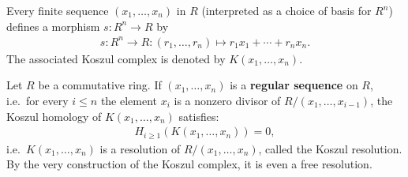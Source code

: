     \begin{example}
        Every finite sequence $(x_1,\ldots,x_n)$ in $R$ (interpreted as a choice of basis for $R^n$) defines a morphism $s:R^n\rightarrow R$ by
        \begin{gather}
            s:R^n\rightarrow R:(r_1,\ldots,r_n)\mapsto r_1x_1+\cdots+r_nx_n.
        \end{gather}
        The associated Koszul complex is denoted by $K(x_1,\ldots,x_n)$.
    \end{example}
    \begin{property}\label{homalg:koszul_resolution}
        Let $R$ be a commutative ring. If $(x_1,\ldots,x_n)$ is a \textbf{regular sequence} on $R$, i.e.~for every $i\leq n$ the element $x_i$ is a nonzero divisor of $R/(x_1,\ldots,x_{i-1})$, the Koszul homology of $K(x_1,\ldots,x_n)$ satisfies:
        \begin{gather}
            H_{i\geq1}(K(x_1,\ldots,x_n)) = 0,
        \end{gather}
        i.e.~$K(x_1,\ldots,x_n)$ is a resolution of $R/(x_1,\ldots,x_n)$, called the Koszul resolution. By the very construction of the Koszul complex, it is even a free resolution.
    \end{property}

